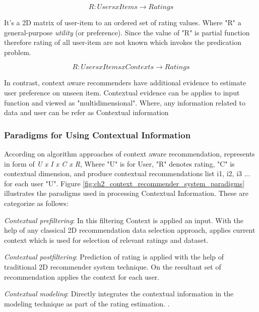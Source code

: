 \begin{equation} 
R : Users x Items \rightarrow Ratings
\end{equation}

It’s a 2D matrix of user-item to an ordered set of rating values. Where "R" a general-purpose \textit{utility} (or preference). Since the value of "R" is partial function therefore rating of all user-item are not known which invokes the predication problem.

\begin{equation} 
R : Users x Items x Contexts \rightarrow Ratings
\end{equation}

In contrast, context aware recommenders have additional evidence to estimate user preference on unseen item. Contextual evidence can be applies to input function and viewed as "multidimensional". Where, any information related to data and user can be refer as Contextual information

\subsubsection{Paradigms for Using Contextual Information}

According on algorithm approaches of context aware recommendation, represents in form of \textit{U x I x C x R}, Where "U" is for User, "R" denotes rating, "C" is contextual dimension, and produce contextual recommendations list i1, i2, i3 ... for each user "U". Figure \ref{fig:ch2_context_recommender_system_paradigms} illustrates the paradigms used in processing Contextual Information. These are categorize as follows:\newline

\textit{Contextual prefiltering}: In this filtering Context is applied an input. With the help of any classical 2D recommendation data selection approach, applies current context which is used for selection of relevant ratings and dataset.\newline

\textit{Contextual postfiltering}: Prediction of rating is applied with the help of traditional 2D recommender system technique. On the resultant set of recommendation applies the context for each user. \newline

\textit{Contextual modeling}: Directly integrates the contextual information in the modeling technique as part of the rating estimation. .\newline


